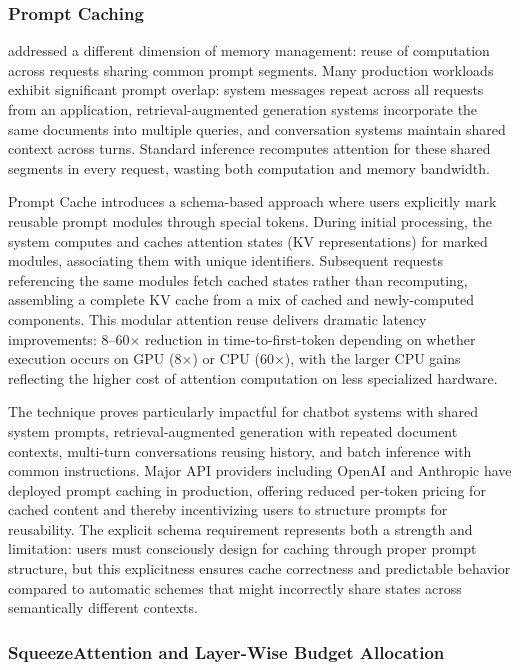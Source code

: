 \subsubsection{Prompt Caching}

\citet{gao2024prompt} addressed a different dimension of memory management: reuse of computation across requests sharing common prompt segments. Many production workloads exhibit significant prompt overlap: system messages repeat across all requests from an application, retrieval-augmented generation systems incorporate the same documents into multiple queries, and conversation systems maintain shared context across turns. Standard inference recomputes attention for these shared segments in every request, wasting both computation and memory bandwidth.

Prompt Cache introduces a schema-based approach where users explicitly mark reusable prompt modules through special tokens. During initial processing, the system computes and caches attention states (KV representations) for marked modules, associating them with unique identifiers. Subsequent requests referencing the same modules fetch cached states rather than recomputing, assembling a complete KV cache from a mix of cached and newly-computed components. This modular attention reuse delivers dramatic latency improvements: 8--60$\times$ reduction in time-to-first-token depending on whether execution occurs on GPU (8$\times$) or CPU (60$\times$), with the larger CPU gains reflecting the higher cost of attention computation on less specialized hardware.

The technique proves particularly impactful for chatbot systems with shared system prompts, retrieval-augmented generation with repeated document contexts, multi-turn conversations reusing history, and batch inference with common instructions. Major API providers including OpenAI and Anthropic have deployed prompt caching in production, offering reduced per-token pricing for cached content and thereby incentivizing users to structure prompts for reusability. The explicit schema requirement represents both a strength and limitation: users must consciously design for caching through proper prompt structure, but this explicitness ensures cache correctness and predictable behavior compared to automatic schemes that might incorrectly share states across semantically different contexts.

\subsubsection{SqueezeAttention and Layer-Wise Budget Allocation}

